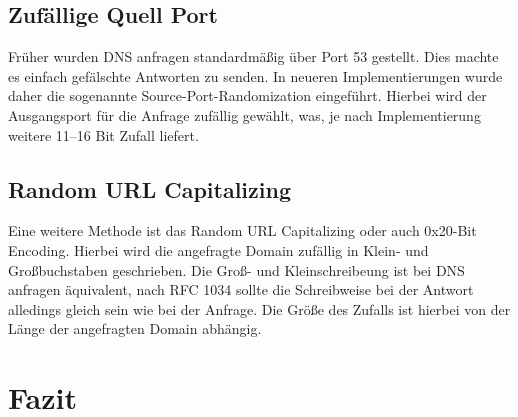 \documentclass[10pt,a4paper]{article}
\begin{document}
\subsection*{Zufällige Quell Port}
Früher wurden DNS anfragen standardmäßig über Port 53 gestellt. Dies machte es einfach gefälschte Antworten zu senden. In neueren Implementierungen wurde daher die sogenannte Source-Port-Randomization eingeführt. Hierbei wird der Ausgangsport für die Anfrage zufällig gewählt, was, je nach Implementierung weitere 11–16 Bit Zufall liefert.

\subsection*{Random URL Capitalizing}
Eine weitere Methode ist das Random URL Capitalizing oder auch 0x20-Bit Encoding. Hierbei wird die angefragte Domain zufällig in Klein- und Großbuchstaben geschrieben. Die Groß- und Kleinschreibeung ist bei DNS anfragen äquivalent, nach RFC 1034 sollte die Schreibweise bei der Antwort alledings gleich sein wie bei der Anfrage. Die Größe des Zufalls ist hierbei von der Länge der angefragten Domain abhängig.
\section{Fazit}
\end{document}
